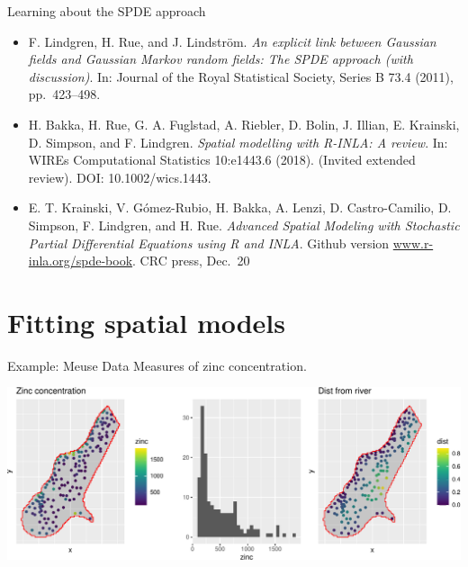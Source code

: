 \documentclass[
  ignorenonframetext,
]{beamer}
\begin{document}
\begin{frame}{Learning about the SPDE approach}
\protect\hypertarget{learning-about-the-spde-approach}{}
\begin{itemize}
\item
  F. Lindgren, H. Rue, and J. Lindström. \emph{An explicit link between
  Gaussian fields and Gaussian Markov random fields: The SPDE approach
  (with discussion)}. In: Journal of the Royal Statistical Society,
  Series B 73.4 (2011), pp.~423--498.
\item
  H. Bakka, H. Rue, G. A. Fuglstad, A. Riebler, D. Bolin, J. Illian, E.
  Krainski, D. Simpson, and F. Lindgren. \emph{Spatial modelling with
  R-INLA: A review}. In: WIREs Computational Statistics 10:e1443.6
  (2018). (Invited extended review). DOI: 10.1002/wics.1443.
\item
  E. T. Krainski, V. Gómez-Rubio, H. Bakka, A. Lenzi, D. Castro-Camilio,
  D. Simpson, F. Lindgren, and H. Rue. \emph{Advanced Spatial Modeling
  with Stochastic Partial Differential Equations using R and INLA}.
  Github version \url{www.r-inla.org/spde-book}. CRC press, Dec.~20
\end{itemize}
\end{frame}

\hypertarget{fitting-spatial-models}{%
\section{Fitting spatial models}\label{fitting-spatial-models}}

\begin{frame}{Example: Meuse Data}
\protect\hypertarget{example-meuse-data}{}
Measures of zinc concentration.

\begin{center}\includegraphics[width=0.6\linewidth,height=0.5\textheight]{Part3_Spatial_files/figure-beamer/unnamed-chunk-9-1} \end{center}
\end{frame}
\end{document}
